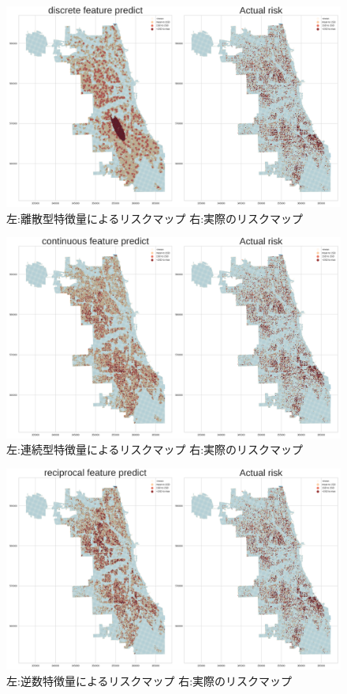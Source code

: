 \documentclass[12pt,a4paper,oneside]{jsbook}
\theoremstyle{plain}
\begin{document}
\begin{figure}
  \centering %
  \includegraphics[scale=0.25]{./non-crime-val-figure/discrete_riskmap.png}
  \caption{左:離散型特徴量によるリスクマップ 右:実際のリスクマップ}
  \label{fig:nc-val-discrete}
\end{figure}

\begin{figure}
  \centering %
  \includegraphics[scale=0.25]{./non-crime-val-figure/continuous_riskmap.png}
  \caption{左:連続型特徴量によるリスクマップ 右:実際のリスクマップ}
  \label{fig:nc-val-continuous}
\end{figure}

\begin{figure}
  \centering %
  \includegraphics[scale=0.25]{./non-crime-val-figure/reciprocal_riskmap.png}
  \caption{左:逆数特徴量によるリスクマップ 右:実際のリスクマップ}
  \label{fig:nc-val-reciprocal}
\end{figure}
\end{document}
